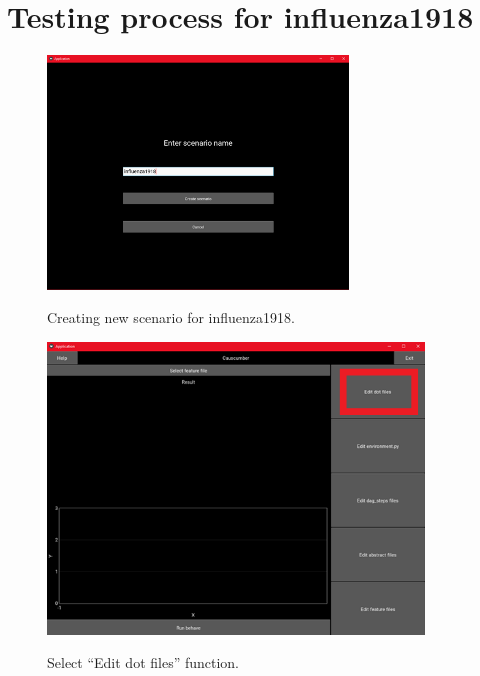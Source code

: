 \chapter{Testing process for influenza1918}
\begin{figure}[H]
	\centering
	\includegraphics[width=8cm]{figures/influenzaTestProcess1.png}\\
	\caption{Creating new scenario for influenza1918.}
	\label{fig:figure19}
\end{figure}
\begin{figure}[H]
	\centering
	\includegraphics[width=10cm]{figures/influenzaTestProcess2.png}\\
	\caption{Select “Edit dot files” function.}
	\label{fig:figure20}
\end{figure}
